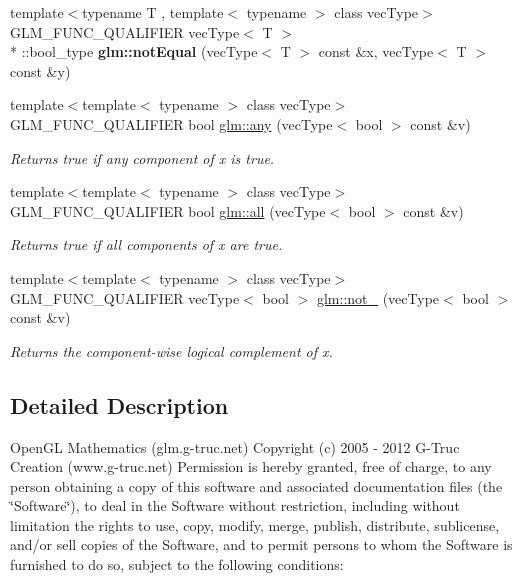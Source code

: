 \begin{DoxyCompactItemize}
\item 
\hypertarget{namespaceglm_ab8dd4009e5f297ce53e1132ca4468745}{{\footnotesize template$<$typename T , template$<$ typename $>$ class vec\-Type$>$ }\\G\-L\-M\-\_\-\-F\-U\-N\-C\-\_\-\-Q\-U\-A\-L\-I\-F\-I\-E\-R vec\-Type$<$ T $>$\\*
\-::bool\-\_\-type {\bfseries glm\-::not\-Equal} (vec\-Type$<$ T $>$ const \&x, vec\-Type$<$ T $>$ const \&y)}\label{namespaceglm_ab8dd4009e5f297ce53e1132ca4468745}

\item 
{\footnotesize template$<$template$<$ typename $>$ class vec\-Type$>$ }\\G\-L\-M\-\_\-\-F\-U\-N\-C\-\_\-\-Q\-U\-A\-L\-I\-F\-I\-E\-R bool \hyperlink{group__core__func__vector__relational_ga7141e1fafe91560d8c8789901d1c1271}{glm\-::any} (vec\-Type$<$ bool $>$ const \&v)
\begin{DoxyCompactList}\small\item\em Returns true if any component of x is true. \end{DoxyCompactList}\item 
{\footnotesize template$<$template$<$ typename $>$ class vec\-Type$>$ }\\G\-L\-M\-\_\-\-F\-U\-N\-C\-\_\-\-Q\-U\-A\-L\-I\-F\-I\-E\-R bool \hyperlink{group__core__func__vector__relational_ga349edc1a383fff08c6d577428416a73b}{glm\-::all} (vec\-Type$<$ bool $>$ const \&v)
\begin{DoxyCompactList}\small\item\em Returns true if all components of x are true. \end{DoxyCompactList}\item 
{\footnotesize template$<$template$<$ typename $>$ class vec\-Type$>$ }\\G\-L\-M\-\_\-\-F\-U\-N\-C\-\_\-\-Q\-U\-A\-L\-I\-F\-I\-E\-R vec\-Type$<$ bool $>$ \hyperlink{group__core__func__vector__relational_gac44e885cf2f0b0896124d7ce5df6ed4f}{glm\-::not\-\_\-} (vec\-Type$<$ bool $>$ const \&v)
\begin{DoxyCompactList}\small\item\em Returns the component-\/wise logical complement of x. \end{DoxyCompactList}\end{DoxyCompactItemize}


\subsection{Detailed Description}
Open\-G\-L Mathematics (glm.\-g-\/truc.\-net) Copyright (c) 2005 -\/ 2012 G-\/\-Truc Creation (www.\-g-\/truc.\-net) Permission is hereby granted, free of charge, to any person obtaining a copy of this software and associated documentation files (the \char`\"{}\-Software\char`\"{}), to deal in the Software without restriction, including without limitation the rights to use, copy, modify, merge, publish, distribute, sublicense, and/or sell copies of the Software, and to permit persons to whom the Software is furnished to do so, subject to the following conditions\-:

